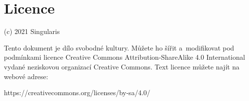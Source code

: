 \section{Licence}

\noindent (c) 2021 Singularis

Tento dokument je dílo svobodné kultury. Můžete ho šířit a modifikovat pod
podmínkami licence Creative Commons Attribution-ShareAlike 4.0 International
vydané neziskovou organizací Creative Commons. Text licence
můžete najít na webové adrese:

https://creativecommons.org/licenses/by-sa/4.0/


